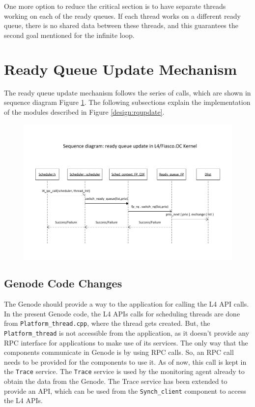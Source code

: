 One more option to reduce the critical section is to have separate threads working on each of the ready queues. If each thread works on a different ready queue, there is no shared data between these threads, and this guarantees the second goal mentioned for the infinite loop. 
 
\section{Ready Queue Update Mechanism}

The ready queue update mechanism follows the series of calls, which are shown in sequence diagram Figure \ref{fig:Drawing2}. The following subsections explain the implementation of the modules described in Figure \ref{design:rqupdate}.

\begin{figure}[h]
\centering
\includegraphics[width=1.0\linewidth]{figures/Drawing2}
\caption{}
\label{fig:Drawing2}
\end{figure}

\subsection{Genode Code Changes}

The Genode should provide a way to the application for calling the L4 API calls. In the present Genode code, the L4 APIs calls for scheduling threads are done from \texttt{Platform\_thread.cpp}, where the thread gets created. But, the \texttt{Platform\_thread} is not accessible from the application, as it doesn't provide any RPC interface for applications to make use of its services. The only way that the components communicate in Genode is by using RPC calls. So, an RPC call needs to be provided for the components to use it. As of now, this call is kept in the \texttt{Trace} service. The \texttt{Trace} service is used by the monitoring agent already to obtain the data from the Genode. The Trace service has been extended to provide an API, which can be used from the \texttt{Synch\_client} component to access the L4 APIs.

